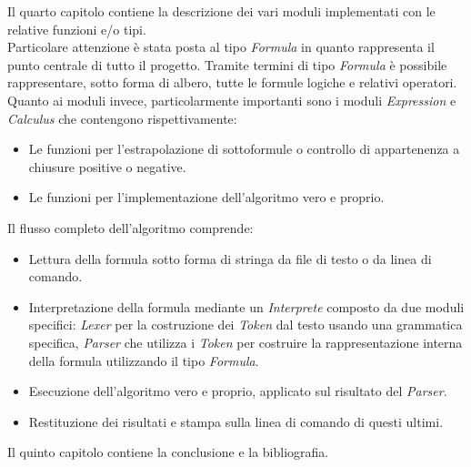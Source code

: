 \documentclass{oist}
\begin{document}
Il quarto capitolo contiene la descrizione dei vari moduli implementati con le relative funzioni e/o tipi. \\
Particolare attenzione è stata posta al tipo \textit{Formula} in quanto rappresenta il punto centrale di tutto il progetto. Tramite termini di tipo \textit{Formula} è possibile rappresentare, sotto forma di albero, tutte le formule logiche e relativi operatori. \\
Quanto ai moduli invece, particolarmente importanti sono i moduli \textit{Expression} e \textit{Calculus} che contengono rispettivamente:
\begin{itemize}
    \item Le funzioni per l'estrapolazione di sottoformule o controllo di appartenenza a chiusure positive o negative.
    \item Le funzioni per l'implementazione dell'algoritmo vero e proprio.
\end{itemize}
Il flusso completo dell'algoritmo comprende:
\begin{itemize}
    \item Lettura della formula sotto forma di stringa da file di testo o da linea di comando.
    \item Interpretazione della formula mediante un \textit{Interprete} composto da due moduli specifici: \textit{Lexer} per la costruzione dei \textit{Token} dal testo usando una grammatica specifica, \textit{Parser} che utilizza i \textit{Token} per costruire la rappresentazione interna della formula utilizzando il tipo \textit{Formula}.
    \item Esecuzione dell'algoritmo vero e proprio, applicato sul risultato del \textit{Parser}.
    \item Restituzione dei risultati e stampa sulla linea di comando di questi ultimi.
\end{itemize}

Il quinto capitolo contiene la conclusione e la bibliografia. \\

\printbibliography
{}
\end{document}
